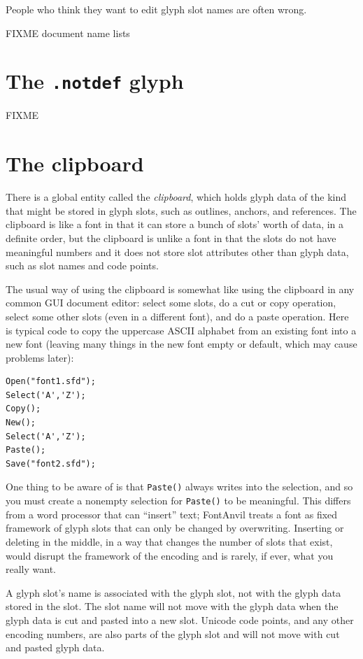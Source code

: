 \documentclass[11pt]{report}
\begin{document}
\begin{framed}
People who think they want to edit glyph slot names are often wrong.
\end{framed}

FIXME document name lists

\section{The \texttt{.notdef} glyph}

FIXME

\section{The clipboard}

There is a global entity called the \emph{clipboard}, which holds glyph data
of the kind that might be stored in glyph slots, such as outlines, anchors,
and references.  The clipboard is like a font in that it can store a bunch
of slots' worth of data, in a definite order, but the clipboard is unlike a
font in that the slots do not have meaningful numbers and it does not store
slot attributes other than glyph data, such as slot names and code points. 

The usual way of using the clipboard is somewhat like using the clipboard in
any common GUI document editor: select some slots, do a cut or copy
operation, select some other slots (even in a different font), and do a
paste operation.  Here is typical code to copy the uppercase ASCII alphabet
from an existing font into a new font (leaving many things in the new font
empty or default, which may cause problems later):

\begin{verbatim}
Open("font1.sfd");
Select('A','Z');
Copy();
New();
Select('A','Z');
Paste();
Save("font2.sfd");
\end{verbatim}

One thing to be aware of is that \texttt{Paste()} always writes into the
selection, and so you must create a nonempty selection for \texttt{Paste()}
to be meaningful.  This differs from a word processor that can ``insert''
text; FontAnvil treats a font as fixed framework of glyph slots that can
only be changed by overwriting.  Inserting or deleting in the middle, in a
way that changes the number of slots that exist, would disrupt the framework
of the encoding and is rarely, if ever, what you really want.

\begin{framed}
A glyph slot's name is associated with the glyph slot, not with the glyph
data stored in the slot.  The slot name will not move with the glyph data
when the glyph data is cut and pasted into a new slot.  Unicode code points,
and any other encoding numbers, are also parts of the glyph slot and will
not move with cut and pasted glyph data.
\end{framed}
\end{document}
